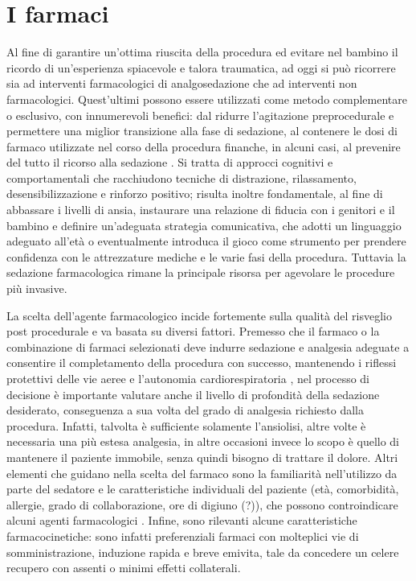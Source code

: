 \chapter{I farmaci}

Al fine di garantire un'ottima riuscita della procedura ed evitare nel bambino il ricordo di un'esperienza spiacevole e talora traumatica, ad oggi si può ricorrere sia ad interventi farmacologici di analgosedazione che ad interventi non farmacologici. Quest'ultimi possono essere utilizzati come metodo complementare o esclusivo, con innumerevoli benefici: dal ridurre l'agitazione preprocedurale e permettere una miglior transizione alla fase di sedazione, al contenere le dosi di farmaco utilizzate nel corso della procedura finanche, in alcuni casi, al prevenire del tutto il ricorso alla sedazione \cite{Uptodate}. Si tratta di approcci cognitivi e comportamentali che racchiudono tecniche di distrazione, rilassamento, desensibilizzazione e rinforzo positivo; risulta inoltre fondamentale, al fine di abbassare i livelli di ansia, instaurare una relazione di fiducia con i genitori e il bambino e definire un'adeguata strategia comunicativa, che adotti un linguaggio adeguato all'età o eventualmente introduca il gioco come strumento per prendere confidenza con le attrezzature mediche e le varie fasi della procedura. Tuttavia la sedazione farmacologica rimane la principale risorsa per agevolare le procedure più invasive. 

La scelta dell'agente farmacologico incide fortemente sulla qualità del risveglio post procedurale e va basata su diversi fattori. Premesso che il farmaco o la combinazione di farmaci selezionati deve indurre sedazione e analgesia adeguate a consentire il completamento della procedura con successo, mantenendo i riflessi protettivi delle vie aeree e l'autonomia cardiorespiratoria \cite{Krauss2006}, nel processo di decisione è importante valutare anche il livello di profondità della sedazione desiderato, conseguenza a sua volta del grado di analgesia richiesto dalla procedura. Infatti, talvolta è sufficiente solamente l'ansiolisi, altre volte è necessaria una più estesa analgesia, in altre occasioni invece lo scopo è quello di mantenere il paziente immobile, senza quindi bisogno di trattare il dolore. Altri elementi che guidano nella scelta del farmaco sono la familiarità nell'utilizzo da parte del sedatore e le caratteristiche individuali del paziente (età, comorbidità, allergie, grado di collaborazione, {\color{orange} ore di digiuno (?)}), che possono controindicare alcuni agenti farmacologici \cite{Uptodate}.
Infine, sono rilevanti alcune caratteristiche farmacocinetiche: sono infatti preferenziali farmaci con molteplici vie di somministrazione, induzione rapida e breve emivita, tale da concedere un celere recupero con assenti o minimi effetti collaterali.

